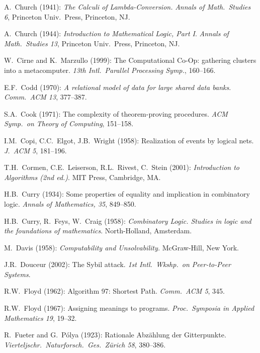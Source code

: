 \begin{thebibliography}{999}
A.~Church (1941):
{\it The Calculi of Lambda-Conversion.}
{\it Annals of Math.~Studies 6}, Princeton Univ.~Press, Princeton, NJ.

A.~Church (1944):
{\it Introduction to Mathematical Logic, Part I}.
{\it Annals of Math.~Studies 13}, Princeton Univ.~Press, Princeton, NJ.

W.~Cirne and K.~Marzullo (1999): The Computational Co-Op: gathering
clusters into a metacomputer.  {\it 13th Intl.~Parallel Processing
Symp.}, 160--166.

E.F.~Codd (1970):  {\it A relational model of data for large shared
data banks}.  {\it Comm.~ACM 13}, 377--387.

S.A.~Cook (1971): The complexity of theorem-proving procedures.  {\it
ACM Symp.~on Theory of Computing}, 151--158.

I.M.~Copi, C.C.~Elgot, J.B.~Wright (1958): Realization of events by
logical nets.  {\it J.~ACM 5}, 181--196.

T.H.~Cormen, C.E.~Leiserson, R.L.~Rivest, C.~Stein (2001):
{\it Introduction to Algorithms (2nd ed.)}.
MIT Press, Cambridge, MA.

H.B.~Curry (1934): Some properties of equality and implication in
combinatory logic.  {\it Annals of Mathematics, 35}, 849--850.

H.B.~Curry, R.~Feys, W.~Craig (1958):
{\it Combinatory Logic.  Studies in logic and the foundations of
mathematics}.  North-Holland, Amsterdam.


M.~Davis (1958):
{\it Computability and Unsolvability.}
McGraw-Hill, New York.

J.R.~Douceur (2002): The Sybil attack.  {\it 1st Intl.~Wkshp.~on
Peer-to-Peer Systems}.


R.W.~Floyd (1962): Algorithm 97: Shortest Path.  {\it Comm.~ACM 5}, 345.

R.W.~Floyd (1967): Assigning meanings to programs.  {\it
Proc.~Symposia in Applied Mathematics 19}, 19--32.

R.~Fueter and G.~P\'{o}lya (1923):
Rationale Abz\"{a}hlung der Gitterpunkte.  {\it
Vierteljschr.~Naturforsch.~Ges.~Z\"{u}rich 58}, 380--386.



\end{thebibliography}
